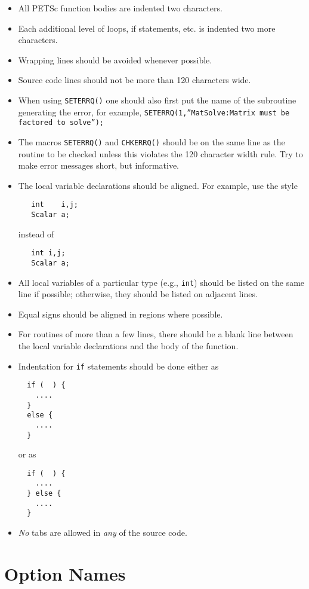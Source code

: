 \begin{itemize}
\item All PETSc function bodies are indented two characters.
\item Each additional level of loops, if statements, etc. is indented
      two more characters.
\item Wrapping lines should be avoided whenever possible.
\item Source code lines should not be more than 120 characters wide.
\item When using {\tt SETERRQ()} one should also first put the name of 
      the subroutine generating the error, for example,
      {\tt SETERRQ(1,''MatSolve:Matrix must be factored to solve'');}
\item The macros {\tt SETERRQ()} and {\tt CHKERRQ()} should be on the 
      same line as the routine to be checked unless this violates the 
      120 character width rule. Try to make error messages short, but 
      informative.
\item The local variable declarations should be aligned. For example,
      use the style
\begin{verbatim}
   int    i,j;
   Scalar a;
\end{verbatim}
instead of
\begin{verbatim}
   int i,j;
   Scalar a;
\end{verbatim}
\item All local variables of a particular type (e.g., {\tt int}) should be 
      listed on the same line if possible; otherwise, they should be listed
      on adjacent lines.
\item Equal signs should be aligned in regions where possible.
\item For routines of more than a few lines, there should be a blank line
      between the local variable declarations and the body of the function.
\item Indentation for {\tt if} statements should be done either as
\begin{verbatim}
  if (  ) {
    ....
  }
  else {
    ....
  }
\end{verbatim}
or as
\begin{verbatim}
  if (  ) {
    ....
  } else {
    ....
  }
\end{verbatim}
\item {\em No} tabs are allowed in {\em any} of the source code.
\end{itemize}

\section{Option Names}

